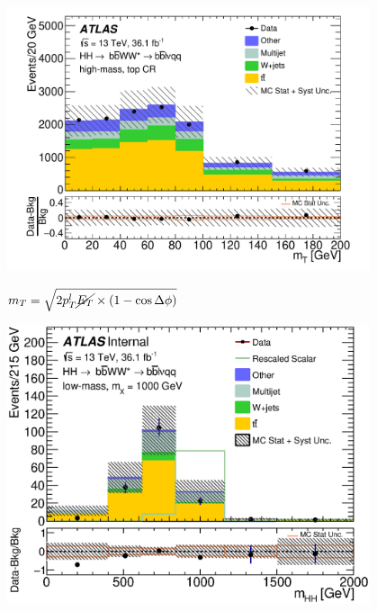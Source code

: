 \documentclass{beamer}
\newcommand*{\met}{\ensuremath{\cancel{E_{T}}}\xspace}
\newcommand*{\header}[1]{\fontsize{16}{8}\selectfont \textbf{{\color{MyPurple}{#1}}}}
\begin{document}
\begin{frame}
\begin{columns}
\begin{column}{0.5\textwidth}
\end{column}
\end{columns}
\end{frame}

\begin{frame}
\begin{center}
\header{Background Shape Check}
\end{center}
\begin{center}
\includegraphics[width=0.8\textwidth]{figures/C_mBBcr_reOpt2000_bbpt350_wlepmtben_regionA_met25d020-eps-converted-to}
\end{center}
\small
$m_T = \sqrt{2p_T^l\met\times{}(1-\cos{\Delta{\phi}})}$
\end{frame}

\begin{frame}
\begin{center}
\header{Resonant Production Signal Region}
\end{center}
\begin{center}
\includegraphics[width=0.8\textwidth]{figures/C_reOpt700_mww_bbpt210_wwpt250_mbb_hhMass_regionA_met25d020}
\end{center}
\end{frame}
\end{document}
